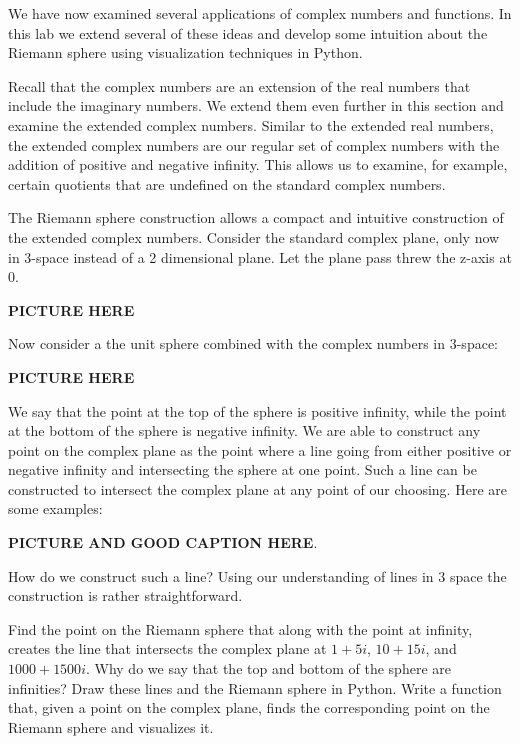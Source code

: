

We have now examined several applications of complex numbers and functions.  In this lab we extend several of these ideas and develop some intuition about the Riemann sphere using visualization techniques in Python.

Recall that the complex numbers are an extension of the real numbers that include the imaginary numbers.  We extend them even further in this section and examine the extended complex numbers.  Similar to the extended real numbers, the extended complex numbers are our regular set of complex numbers with the addition of positive and negative infinity.  This allows us to examine, for example, certain quotients that are undefined on the standard complex numbers.

The Riemann sphere construction allows a compact and intuitive construction of the extended complex numbers.  Consider the standard complex plane, only now in 3-space instead of a 2 dimensional plane.  Let the plane pass threw the z-axis at $0$.

{\bf PICTURE HERE}

Now consider a the unit sphere combined with the complex numbers in 3-space:

{\bf PICTURE HERE}

We say that the point at the top of the sphere is positive infinity, while the point at the bottom of the sphere is negative infinity.  We are able to construct any point on the complex plane as the point where a line going from either positive or negative infinity and intersecting the sphere at one point.  Such a line can be constructed to intersect the complex plane at any point of our choosing.  Here are some examples:

{\bf PICTURE AND GOOD CAPTION HERE}.

How do we construct such a line?  Using our understanding of lines in 3 space the construction is rather straightforward.

\begin{problem}  Find the point on the Riemann sphere that along with the point at infinity, creates the line that intersects the complex plane at $1 + 5i$, $10 + 15i$, and $1000 + 1500i$.  Why do we say that the top and bottom of the sphere are infinities?  Draw these lines and the Riemann sphere in Python.  Write a function that, given a point on the complex plane, finds the corresponding point on the Riemann sphere and visualizes it.
\end{problem}

